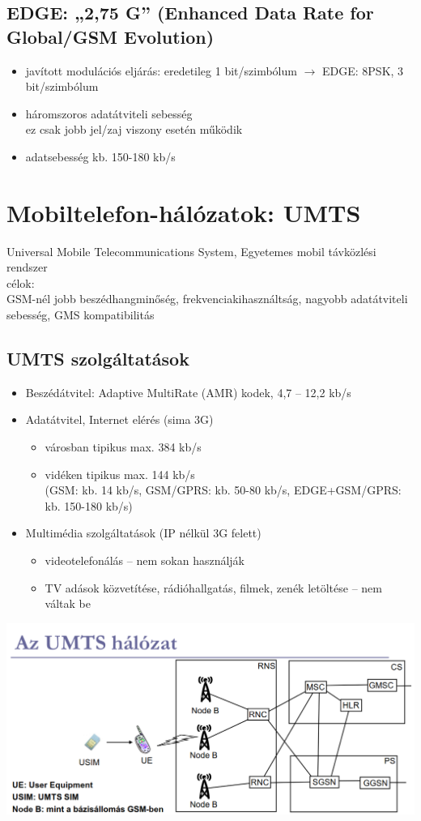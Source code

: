 \documentclass[10pt,a4paper]{article}
\begin{document}
\subsection{EDGE: „2,75 G” (Enhanced Data Rate for Global/GSM Evolution)}
\begin{itemize}
	\item javított modulációs eljárás: eredetileg 1 bit/szimbólum $\rightarrow$ EDGE: 8PSK, 3 bit/szimbólum 
	\item háromszoros adatátviteli sebesség\\ez csak jobb jel/zaj viszony esetén működik
	\item adatsebesség kb. 150-180 kb/s
\end{itemize}
\section{Mobiltelefon-hálózatok: UMTS}
Universal Mobile Telecommunications System, Egyetemes mobil távközlési rendszer\\
célok:
\\ GSM-nél jobb beszédhangminőség, frekvenciakihasználtság, nagyobb adatátviteli sebesség, GMS kompatibilitás
\subsection{UMTS szolgáltatások}
\begin{itemize}
	\item Beszédátvitel: Adaptive MultiRate (AMR) kodek, 4,7 – 12,2 kb/s
	\item Adatátvitel, Internet elérés (sima 3G)
	\begin{itemize}
		\item városban tipikus max. 384 kb/s
		\item vidéken tipikus max. 144 kb/s\\
		\small{(GSM: kb. 14 kb/s, GSM/GPRS: kb. 50-80 kb/s, EDGE+GSM/GPRS: kb. 150-180 kb/s)}
	\end{itemize}
\item Multimédia szolgáltatások (IP nélkül 3G felett)
\begin{itemize}
	\item videotelefonálás – nem sokan használják
	\item TV adások közvetítése, rádióhallgatás, filmek, zenék letöltése –
	nem váltak be
\end{itemize}
\end{itemize}
\begin{center}
	\includegraphics[width=0.6\linewidth]{src/umtsnetw}
\end{center}
\end{document}
